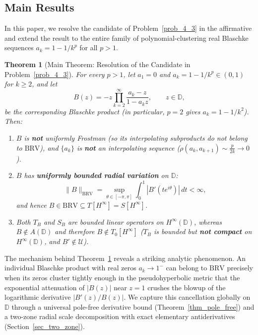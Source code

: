 \documentclass[11pt,reqno]{amsart}
\newtheorem{thm}{Theorem}[section]
\numberwithin{equation}{section}
\newcommand{\D}{\mathbb{D}}
\newcommand{\BRV}{\mathrm{BRV}}
\begin{document}
\subsection{Main Results}

In this paper, we resolve the candidate of Problem~\ref{prob_4_3} in the affirmative and extend the result to the entire family of polynomial-clustering real Blaschke sequences $a_k = 1 - 1/k^p$ for all $p > 1$.

\begin{thm}[Main Theorem: Resolution of the Candidate in Problem~\ref{prob_4_3}] \label{thm_main}
For every $p > 1$, let $a_1 = 0$ and $a_k = 1 - 1/k^p \in (0, 1)$ for $k \ge 2$, and let
\begin{equation} \label{eq_Bp_def}
  B(z) = -z \prod_{k=2}^\infty \frac{a_k - z}{1 - a_k z}, \qquad z \in \D,
\end{equation}
be the corresponding Blaschke product (in particular, $p = 2$ gives $a_k = 1 - 1/k^2$). Then:
\begin{enumerate}
\item $B$ is \textbf{not} uniformly Frostman (so its interpolating subproducts do not belong to $\BRV$), and $\{a_k\}$ is \textbf{not} an interpolating sequence ($\rho(a_k, a_{k+1}) \sim \frac{p}{2k} \to 0$).
\item $B$ has \textbf{uniformly bounded radial variation} on $\D$:
\begin{equation} \label{eq_main_BRV}
  \|B\|_{\BRV} = \sup_{\theta \in [-\pi, \pi]} \int_0^1 |B'(t e^{i\theta})|\,dt < \infty,
\end{equation}
and hence $B \in \BRV \subseteq T[H^\infty] = S[H^\infty]$.
\item Both $T_B$ and $S_B$ are bounded linear operators on $H^\infty(\D)$, whereas $B \notin A(\D)$ and therefore $B \notin T_0[H^\infty]$ ($T_B$ is bounded but \textbf{not compact} on $H^\infty(\D)$, and $B' \notin \mathcal{U}$).
\end{enumerate}
\end{thm}

The mechanism behind Theorem~\ref{thm_main} reveals a striking analytic phenomenon. An individual Blaschke product with real zeros $a_k \to 1^-$ can belong to $\BRV$ precisely when its zeros cluster tightly enough in the pseudohyperbolic metric that the exponential attenuation of $|B(z)|$ near $z = 1$ crushes the blowup of the logarithmic derivative $|B'(z)/B(z)|$. We capture this cancellation globally on $\D$ through a universal pole-free derivative bound (Theorem~\ref{thm_pole_free}) and a two-zone radial scale decomposition with exact elementary antiderivatives (Section~\ref{sec_two_zone}).
\end{document}
